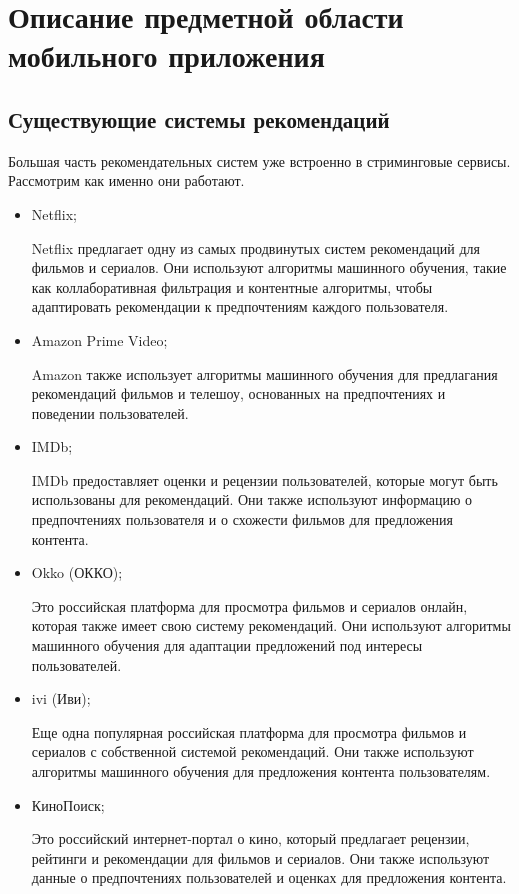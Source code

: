 \section{Описание предметной области мобильного приложения}

\subsection{Существующие системы рекомендаций}
Большая часть рекомендательных систем уже встроенно в стриминговые сервисы.
Рассмотрим как именно они работают.
\begin{itemize}
    \item Netflix; \par
    Netflix предлагает одну из самых продвинутых систем рекомендаций для фильмов и сериалов.
    Они используют алгоритмы машинного обучения, такие как коллаборативная фильтрация и контентные алгоритмы, чтобы
    адаптировать рекомендации к предпочтениям каждого пользователя.

    \item Amazon Prime Video; \par
    Amazon также использует алгоритмы машинного обучения для предлагания рекомендаций фильмов и телешоу,
    основанных на предпочтениях и поведении пользователей.

    \item IMDb; \par
    IMDb предоставляет оценки и рецензии пользователей, которые могут быть использованы для рекомендаций.
    Они также используют информацию о предпочтениях пользователя и о схожести фильмов для предложения контента.

    \item Okko (ОККО); \par
    Это российская платформа для просмотра фильмов и сериалов онлайн, которая также имеет свою систему рекомендаций.
    Они используют алгоритмы машинного обучения для адаптации предложений под интересы пользователей.

    \item ivi (Иви);\par
    Еще одна популярная российская платформа для просмотра фильмов и сериалов с собственной системой рекомендаций.
    Они также используют алгоритмы машинного обучения для предложения контента пользователям.

    \item КиноПоиск;\par
    Это российский интернет-портал о кино, который предлагает рецензии, рейтинги и рекомендации для фильмов и сериалов.
    Они также используют данные о предпочтениях пользователей и оценках для предложения контента.

\end{itemize}

